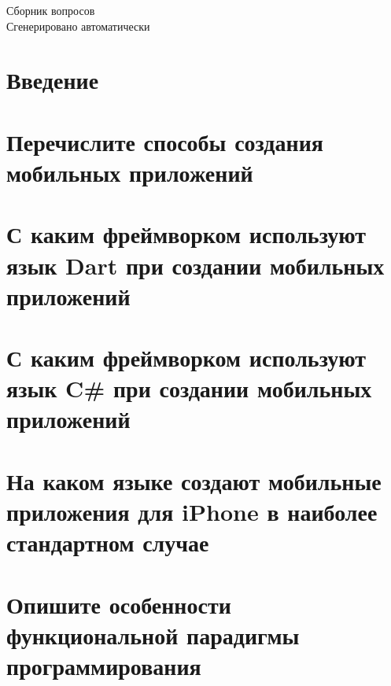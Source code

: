 \documentclass[12pt]{article}
\begin{document}
\begin{center}
  {\LARGE Сборник вопросов}\\[6pt]
  {\large Сгенерировано автоматически}
\end{center}
\vspace{6mm}
\section*{Введение}
\begin{enumerate}[leftmargin=*]
\end{enumerate}
\vspace{2mm}
\section*{Перечислите способы создания мобильных приложений}
\begin{enumerate}[leftmargin=*]
\end{enumerate}
\vspace{2mm}
\section*{С каким фреймворком используют язык Dart при создании мобильных приложений}
\begin{enumerate}[leftmargin=*]
\end{enumerate}
\vspace{2mm}
\section*{С каким фреймворком используют язык C# при создании мобильных приложений}
\begin{enumerate}[leftmargin=*]
\end{enumerate}
\vspace{2mm}
\section*{На каком языке создают мобильные приложения для iPhone в наиболее стандартном случае}
\begin{enumerate}[leftmargin=*]
\end{enumerate}
\vspace{2mm}
\section*{Опишите особенности функциональной парадигмы программирования}
\begin{enumerate}[leftmargin=*]
\end{enumerate}
\vspace{2mm}
\end{document}
